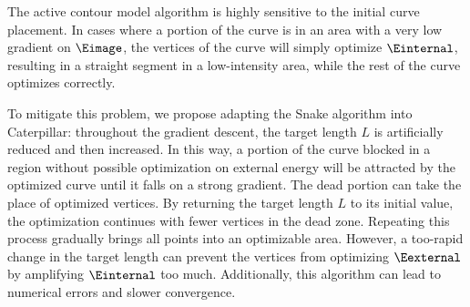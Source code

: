 The active contour model algorithm is highly sensitive to the initial curve placement. In cases where a portion of the curve is in an area with a very low gradient on $\Eimage$, the vertices of the curve will simply optimize $\Einternal$, resulting in a straight segment in a low-intensity area, while the rest of the curve optimizes correctly.

To mitigate this problem, we propose adapting the Snake algorithm into Caterpillar: throughout the gradient descent, the target length $L$ is artificially reduced and then increased. In this way, a portion of the curve blocked in a region without possible optimization on external energy will be attracted by the optimized curve until it falls on a strong gradient. The dead portion can take the place of optimized vertices. By returning the target length $L$ to its initial value, the optimization continues with fewer vertices in the dead zone. Repeating this process gradually brings all points into an optimizable area. However, a too-rapid change in the target length can prevent the vertices from optimizing $\Eexternal$ by amplifying $\Einternal$ too much. Additionally, this algorithm can lead to numerical errors and slower convergence.
